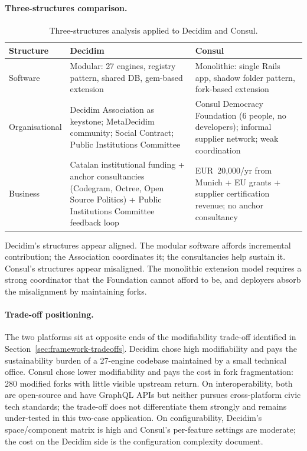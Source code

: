 \documentclass[11pt,a4paper]{article}
\begin{document}
\paragraph{Three-structures comparison.}

\begin{table}[!htbp]
\centering
\caption{Three-structures analysis \citep{christensen2014analysis} applied to Decidim and Consul.}
\label{tab:threestructure}
\renewcommand{\arraystretch}{1.3}
\begin{tabularx}{\textwidth}{lXX}
\toprule
\textbf{Structure} & \textbf{Decidim} & \textbf{Consul} \\
\midrule
Software       & Modular: 27 engines, registry pattern, shared DB, gem-based extension & Monolithic: single Rails app, shadow folder pattern, fork-based extension \\
\midrule
Organisational & Decidim Association as keystone; MetaDecidim community; Social Contract; Public Institutions Committee & Consul Democracy Foundation (6 people, no developers); informal supplier network; weak coordination \\
\midrule
Business       & Catalan institutional funding + anchor consultancies (Codegram, Octree, Open Source Politics) + Public Institutions Committee feedback loop & EUR~20{,}000/yr from Munich + EU grants + supplier certification revenue; no anchor consultancy \\
\bottomrule
\end{tabularx}
\end{table}

Decidim's structures appear aligned. The modular software affords incremental contribution; the Association coordinates it; the consultancies help sustain it. Consul's structures appear misaligned. The monolithic extension model requires a strong coordinator that the Foundation cannot afford to be, and deployers absorb the misalignment by maintaining forks.

\paragraph{Trade-off positioning.}
The two platforms sit at opposite ends of the modifiability trade-off identified in Section~\ref{sec:framework-tradeoffs}. Decidim chose high modifiability and pays the sustainability burden of a 27-engine codebase maintained by a small technical office. Consul chose lower modifiability and pays the cost in fork fragmentation: 280 modified forks with little visible upstream return. On interoperability, both are open-source and have GraphQL APIs but neither pursues cross-platform civic tech standards; the trade-off does not differentiate them strongly and remains under-tested in this two-case application. On configurability, Decidim's space/component matrix is high and Consul's per-feature settings are moderate; the cost on the Decidim side is the configuration complexity \citet{palacin2024configurations} document.
\end{document}

